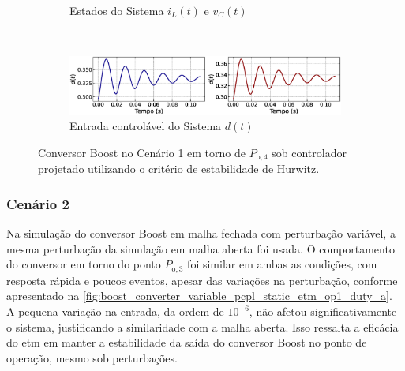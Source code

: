 \begin{figure}[H]
\begin{subfigure}{1.\textwidth}
    \caption{Estados do Sistema $i_L(t)$  e $v_C(t)$}
  \end{subfigure}
  \\[6pt]
  \begin{subfigure}{1.\textwidth}
    \centering
    \includegraphics[width=1.\textwidth]{figuras/classic/boost/sim1/op2/duty-cycle.eps}
    \caption{Entrada controlável do Sistema $d(t)$}
  \end{subfigure}
  \caption{Conversor Boost no Cenário 1 em torno de $P_{\mathrm{o}, 4}$ sob controlador projetado utilizando o critério de estabilidade de Hurwitz.}
  \label{fig:classic_boost_cen1_op2}
\end{figure}

\subsubsection{Cenário 2}

Na simulação do conversor Boost em malha fechada com perturbação variável, a mesma perturbação da simulação em malha aberta foi usada. O comportamento do conversor em torno do ponto $P_{\mathrm{o}, 3}$ foi similar em ambas as condições, com resposta rápida e poucos eventos, apesar das variações na perturbação, conforme apresentado na \autoref{fig:boost_converter_variable_pcpl_static_etm_op1_duty_a}. A pequena variação na entrada, da ordem de $10^{-6}$, não afetou significativamente o sistema, justificando a similaridade com a malha aberta. Isso ressalta a eficácia do \acrshort{etm} em manter a estabilidade da saída do conversor Boost no ponto de operação, mesmo sob perturbações.

